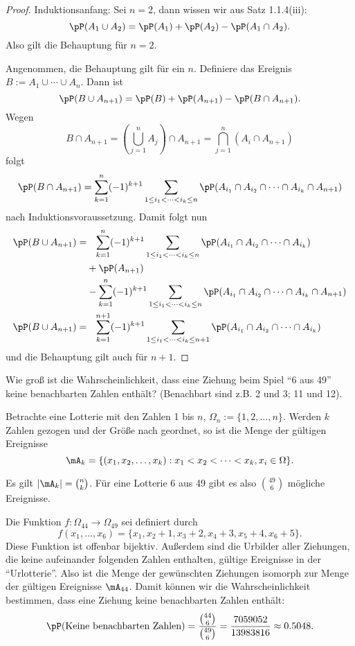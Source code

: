 \begin{proof}
  Induktionsanfang: Sei $n=2$, dann wissen wir aus Satz  1.1.4(iii):
  \[ \pP ( A_1 \cup A_2 ) = \pP( A_1 ) + \pP( A_2 ) - \pP( A_1 \cap A_2 ). \]
  Also gilt die Behauptung für $n=2$.

  Angenommen, die Behauptung gilt für ein $n$. Definiere das Ereignis $B := A_1
  \cup \cdots \cup A_n$. Dann ist
  \[ \pP( B \cup A_{n+1} ) = \pP( B ) + \pP( A_{n+1} ) - \pP( B \cap A_{n+1}
    ). \]
  Wegen
  \[ B \cap A_{n+1} = \left(\bigcup_{j=1}^n A_j\right) \cap A_{n+1} = \bigcap_{j=1}^n (A_i \cap
    A_{n+1}) \]
  folgt
  \[ \pP( B \cap A_{n+1} ) = \sum_{k=1}^n (-1)^{k+1} \sum_{1 \le i_1 < \cdots <
      i_k \le n} \pP( A_{i_1} \cap A_{i_2} \cap \cdots \cap A_{i_k} \cap A_{n+1}
    ) \]
  nach Induktionsvoraussetzung. Damit folgt nun
  \begin{align*}
    \pP( B \cup A_{n+1} ) =
    &\phantom{+} \sum_{k=1}^n (-1)^{k+1} \sum_{1 \le i_1 < \cdots < i_k \le n}
      \pP( A_{i_1} \cap A_{i_2} \cap \cdots \cap A_{i_k}) \\
    &+ \pP( A_{n+1} ) \\
    &- \sum_{k=1}^n (-1)^{k+1} \sum_{1 \le i_1 < \cdots < i_k \le n}
      \pP( A_{i_1} \cap A_{i_2} \cap \cdots \cap A_{i_k} \cap A_{n+1} ) \\
    \pP( B \cup A_{n+1} ) =
    &\phantom{+} \sum_{k=1}^{n+1} (-1)^{k+1}
      \sum_{1 \le i_1 < \cdots < i_k \le n+1} \pP( A_{i_1} \cap A_{i_2} \cap \cdots \cap A_{i_k})
  \end{align*}
  und die Behauptung gilt auch für $n+1$.
\end{proof}

\begin{aufg}
  Wie groß ist die Wahrscheinlichkeit, dass eine Ziehung beim Spiel ``6 aus 49''
  keine benachbarten Zahlen enthält? (Benachbart sind z.B. 2 und 3; 11 und 12).
\end{aufg}

Betrachte eine Lotterie mit den Zahlen 1 bis $n$, $\Omega_n := \{ 1, 2, \ldots,
n \}$. Werden $k$ Zahlen gezogen und der Größe nach geordnet, so ist die Menge
der gültigen Ereignisse
\[ \mA_k = \{ (x_1, x_2, \ldots, x_k) : x_1 < x_2 < \cdots < x_k, x_i \in \Omega
  \}. \]

Es gilt $|\mA_k| = \binom{n}{k}$. Für eine Lotterie 6 aus 49 gibt es also
$\binom{49}{6}$ mögliche Ereignisse.

Die Funktion $f: \Omega_{44} \to \Omega_{49}$ sei definiert durch
\[ f({x_1, \ldots, x_6}) = \{x_1, x_2 + 1, x_3 + 2, x_4 + 3, x_5 + 4, x_6 +5
  \}. \]
Diese Funktion ist offenbar bijektiv. Außerdem sind die Urbilder aller
Ziehungen, die keine aufeinander folgenden Zahlen enthalten, gültige Ereignisse
in der ``Urlotterie''. Also ist die Menge der gewünschten Ziehungen isomorph zur
Menge der gültigen Ereignisse $\mA_{44}$. Damit können wir die
Wahrscheinlichkeit bestimmen, dass eine Ziehung keine benachbarten Zahlen
enthält:
\[ \pP( \text{Keine benachbarten Zahlen} ) = \frac{\binom{44}{6}}{\binom{49}{6}}
  = \frac{7059052}{13983816} \approx 0.5048. \] 

